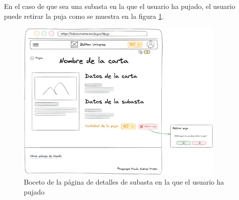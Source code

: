 En el caso de que sea una subasta en la que el usuario ha pujado, el usuario puede retirar la puja como se muestra en la figura \ref{fig:p_auction_details_bid}.
\begin{figure}[H]
    \centering
    \includegraphics[width=0.9\textwidth]{figures/6-Analisis/6-Interfaz/prototipos/detalle-puja.png}
    \caption{Boceto de la página de detalles de subasta en la que el usuario ha pujado}
    \label{fig:p_auction_details_bid}
\end{figure}

